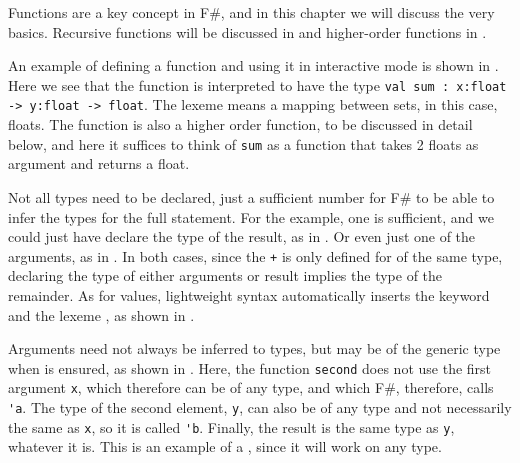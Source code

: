 Functions are a key concept in F\#, and in this chapter we will discuss the very basics. Recursive functions will be discussed in  and higher-order functions in .

An example of defining a function and using it in interactive mode is shown in .
%
%
Here we see that the function is interpreted to have the type \lstinline!val sum : x:float -> y:float -> float!. The \lexeme{->} lexeme means a mapping between sets, in this case, floats. The function is also a higher order function, to be discussed in detail below, and here it suffices to think of \lstinline!sum! as a function that takes 2 floats as argument and returns a float.

Not all types need to be declared, just a sufficient number for F\# to be able to infer the types for the full statement. For the example, one is sufficient, and we could just have declare the type of the result, as in .
%
%
Or even just one of the arguments, as in .
%
%
In both cases, since the \lstinline|+|  is only defined for  of the same type, declaring the type of either arguments or result implies the type of the remainder.  As for values, lightweight syntax automatically inserts the keyword  and the lexeme \lexeme{;}, as shown in .
%
%

Arguments need not always be inferred to types, but may be of the generic type when  is ensured, as shown in .
%
%
Here, the function \lstinline{second} does not use the first argument \lstinline{x}, which therefore can be of any type, and which F\#, therefore, calls \lstinline{'a}. The type of the second element, \lstinline{y}, can also be of any type and not necessarily the same as \lstinline!x!, so it is called \lstinline!'b!. Finally, the result is the same type as \lstinline!y!, whatever it is. This is an example of a , since it will work on any type.

